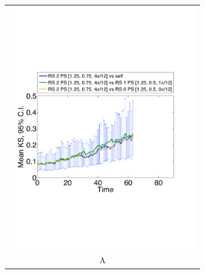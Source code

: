 \documentclass[12pt]{article}
\begin{document}
\begin{figure}[htp]
\begin{tabular}{cc}
	\multicolumn{2}{c}{\includegraphics[width=3.25in]{figures/KSstatPerturb_RS02PS027_vs_RS01PS013_RS06PS012.pdf}} \\
	\multicolumn{2}{c}{A} \\

\end{tabular}
\end{figure}
\end{document}

